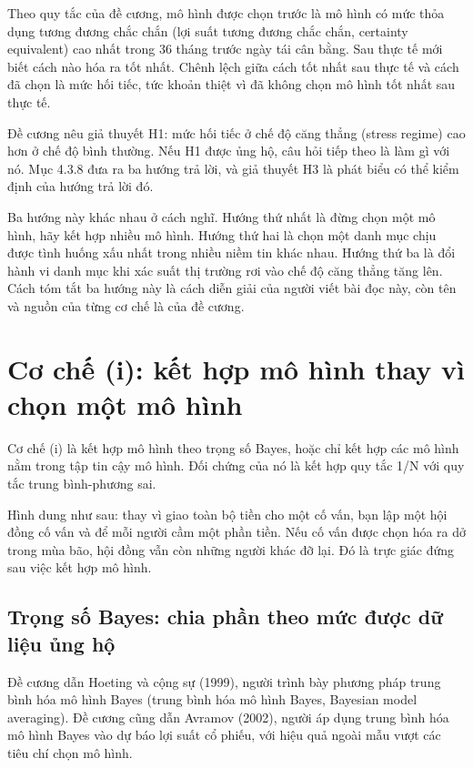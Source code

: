 Theo quy tắc của đề cương, mô hình được chọn trước là mô hình có mức thỏa dụng tương đương chắc chắn (lợi suất tương đương chắc chắn, certainty equivalent) cao nhất trong 36 tháng trước ngày tái cân bằng. Sau thực tế mới biết cách nào hóa ra tốt nhất. Chênh lệch giữa cách tốt nhất sau thực tế và cách đã chọn là mức hối tiếc, tức khoản thiệt vì đã không chọn mô hình tốt nhất sau thực tế.

Đề cương nêu giả thuyết H1: mức hối tiếc ở chế độ căng thẳng (stress regime) cao hơn ở chế độ bình thường. Nếu H1 được ủng hộ, câu hỏi tiếp theo là làm gì với nó. Mục 4.3.8 đưa ra ba hướng trả lời, và giả thuyết H3 là phát biểu có thể kiểm định của hướng trả lời đó.

Ba hướng này khác nhau ở cách nghĩ. Hướng thứ nhất là đừng chọn một mô hình, hãy kết hợp nhiều mô hình. Hướng thứ hai là chọn một danh mục chịu được tình huống xấu nhất trong nhiều niềm tin khác nhau. Hướng thứ ba là đổi hành vi danh mục khi xác suất thị trường rơi vào chế độ căng thẳng tăng lên. Cách tóm tắt ba hướng này là cách diễn giải của người viết bài đọc này, còn tên và nguồn của từng cơ chế là của đề cương.

\section{Cơ chế (i): kết hợp mô hình thay vì chọn một mô hình}

Cơ chế (i) là kết hợp mô hình theo trọng số Bayes, hoặc chỉ kết hợp các mô hình nằm trong tập tin cậy mô hình. Đối chứng của nó là kết hợp quy tắc 1/N với quy tắc trung bình-phương sai.

Hình dung như sau: thay vì giao toàn bộ tiền cho một cố vấn, bạn lập một hội đồng cố vấn và để mỗi người cầm một phần tiền. Nếu cố vấn được chọn hóa ra dở trong mùa bão, hội đồng vẫn còn những người khác đỡ lại. Đó là trực giác đứng sau việc kết hợp mô hình.

\subsection{Trọng số Bayes: chia phần theo mức được dữ liệu ủng hộ}

Đề cương dẫn Hoeting và cộng sự (1999), người trình bày phương pháp trung bình hóa mô hình Bayes (trung bình hóa mô hình Bayes, Bayesian model averaging). Đề cương cũng dẫn Avramov (2002), người áp dụng trung bình hóa mô hình Bayes vào dự báo lợi suất cổ phiếu, với hiệu quả ngoài mẫu vượt các tiêu chí chọn mô hình.

